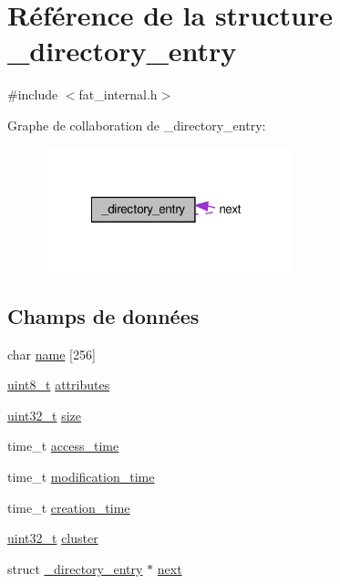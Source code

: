 \hypertarget{struct__directory__entry}{\section{\-Référence de la structure \-\_\-directory\-\_\-entry}
\label{struct__directory__entry}
}


{\ttfamily \#include $<$fat\-\_\-internal.\-h$>$}



\-Graphe de collaboration de \-\_\-directory\-\_\-entry\-:\nopagebreak
\begin{figure}[H]
\begin{center}
\leavevmode
\includegraphics[width=203pt]{struct__directory__entry__coll__graph}
\end{center}
\end{figure}
\subsection*{\-Champs de données}
\begin{DoxyCompactItemize}
\item 
char \hyperlink{struct__directory__entry_ac9142fdeb8e265f045fee1edf9608c78}{name} \mbox{[}256\mbox{]}
\item 
\hyperlink{types_8h_aba7bc1797add20fe3efdf37ced1182c5}{uint8\-\_\-t} \hyperlink{struct__directory__entry_a63da8f87e73a3eb30e55b2d405fa35d7}{attributes}
\item 
\hyperlink{types_8h_a33594304e786b158f3fb30289278f5af}{uint32\-\_\-t} \hyperlink{struct__directory__entry_a5d6f559c1b7ab2b5a64643073172cc25}{size}
\item 
time\-\_\-t \hyperlink{struct__directory__entry_a27e1020c5262094ab3b58759da9660ae}{access\-\_\-time}
\item 
time\-\_\-t \hyperlink{struct__directory__entry_a120c3a3857bd7892a0fc2e6644e6f188}{modification\-\_\-time}
\item 
time\-\_\-t \hyperlink{struct__directory__entry_a95f0f5ef18bf17f332bd0dc352d62ac4}{creation\-\_\-time}
\item 
\hyperlink{types_8h_a33594304e786b158f3fb30289278f5af}{uint32\-\_\-t} \hyperlink{struct__directory__entry_a8c70d9d0c2b2557cba83fb827d5c6e90}{cluster}
\item 
struct \hyperlink{struct__directory__entry}{\-\_\-directory\-\_\-entry} $\ast$ \hyperlink{struct__directory__entry_a75001bda0d1d80e4ff5350ad69f83030}{next}
\end{DoxyCompactItemize}


